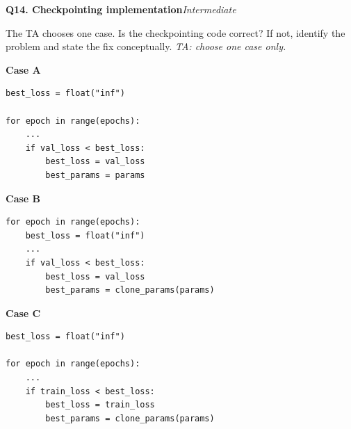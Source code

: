 \documentclass[11pt]{article}
\newif\ifshowanswers
\newenvironment{question}[3]{%
  \par\medskip
  \noindent\textbf{Q#1. #2}\hfill\textit{#3}\par\smallskip
}{\par\medskip}
\newcommand{\answer}[1]{%
  \ifshowanswers
    \begin{quote}\small\textbf{Expected answer:} #1\end{quote}
  \fi
}
\newcommand{\marking}[1]{%
  \ifshowanswers
    \begin{quote}\small\textbf{1 mark:} #1\end{quote}
  \fi
}
\newcommand{\casesnote}{\textit{TA: choose one case only.}}
\begin{document}
\begin{question}{14}{Checkpointing implementation}{Intermediate}
The TA chooses one case. Is the checkpointing code correct? If not, identify the
problem and state the fix conceptually. \casesnote

\textbf{Case A}
\begin{verbatim}
best_loss = float("inf")

for epoch in range(epochs):
    ...
    if val_loss < best_loss:
        best_loss = val_loss
        best_params = params
\end{verbatim}

\textbf{Case B}
\begin{verbatim}
for epoch in range(epochs):
    best_loss = float("inf")
    ...
    if val_loss < best_loss:
        best_loss = val_loss
        best_params = clone_params(params)
\end{verbatim}

\textbf{Case C}
\begin{verbatim}
best_loss = float("inf")

for epoch in range(epochs):
    ...
    if train_loss < best_loss:
        best_loss = train_loss
        best_params = clone_params(params)
\end{verbatim}

\answer{
Case A: Incorrect if \texttt{best\_params = params} only stores references to
the live tensors. Later updates may also change what is considered the saved
checkpoint. Store independent copies/clones of the parameter values.

Case B: Incorrect. \texttt{best\_loss} is reset at the start of every epoch, so
almost every epoch can overwrite the previous checkpoint. Initialize it once
before the training loop.

Case C: Incorrect for the required checkpointing rule. The model is being
selected using training loss rather than validation loss. Compare
\texttt{val\_loss} against the best validation loss.
}

\marking{Student correctly identifies the error in the chosen case and gives
the conceptual correction.}
\end{question}
\end{document}
